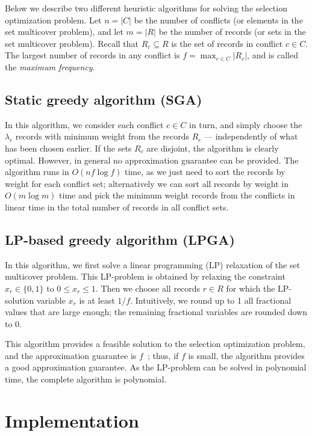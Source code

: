 \documentclass[11pt, oneside]{report}
\begin{document}
Below we describe two different heuristic algorithms for solving the selection optimization problem. Let $n=|C|$ be the number of conflicts (or elements in the set multicover problem), and let $m=|R|$ be the number of records (or sets in the set multicover problem). Recall that $R_c \subseteq R$ is the set of records in conflict $c \in C$. The largest number of records in any conflict is $f = \max_{c \in C} |R_c|$, and is called the \emph{maximum frequency}.

\subsection{Static greedy algorithm (SGA)}
\label{sec:algorithms:sga}

In this algorithm, we consider each conflict $c \in C$ in turn, and simply choose the $\lambda_c$ records with minimum weight from the records $R_c$ --- independently of what has been chosen earlier. If the sets $R_c$ are disjoint, the algorithm is clearly optimal. However, in general no approximation guarantee can be provided. The algorithm runs in $O(n f \log f)$ time, as we just need to sort the records by weight for each conflict set; alternatively we can sort all records by weight in $O(m \log m)$ time and pick the minimum weight records from the conflicts in linear time in the total number of records in all conflict sets.

\subsection{LP-based greedy algorithm (LPGA)}
\label{sec:algorithms:lpga}

In this algorithm, we first solve a linear programming (LP) relaxation of the set multicover problem. This LP-problem is obtained by relaxing the constraint $x_r \in \{0, 1\}$ to $0 \leq x_r \leq 1$. Then we choose all records $r \in R$ for which the LP-solution variable $x_r$ is at least $1 / f$. Intuitively, we round up to 1 all fractional values that are large enough; the remaining fractional variables are rounded down to 0.

This algorithm provides a feasible solution to the selection optimization problem, and the approximation guarantee is $f$~\cite{vazirani2001approximation}; thus, if $f$ is small, the algorithm provides a good approximation guarantee. As the LP-problem can be solved in polynomial time, the complete algorithm is polynomial.


\section{Implementation}
\label{sec:implementation}
\end{document}
